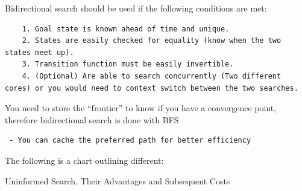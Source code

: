 \documentclass[
  letterpaper,
  DIV=11,
  numbers=noendperiod]{scrartcl}
\begin{document}
Bidirectional search should be used if the following conditions are met:

\begin{verbatim}
    1. Goal state is known ahead of time and unique.
    2. States are easily checked for equality (know when the two states meet up).
    3. Transition function must be easily invertible.
    4. (Optional) Are able to search concurrently (Two different cores) or you would need to context switch between the two searches.
\end{verbatim}

\begin{tcolorbox}[enhanced jigsaw, opacitybacktitle=0.6, title=\textcolor{quarto-callout-note-color}{\faInfo}\hspace{0.5em}{Note}, toptitle=1mm, left=2mm, breakable, titlerule=0mm, bottomtitle=1mm, bottomrule=.15mm, leftrule=.75mm, colframe=quarto-callout-note-color-frame, arc=.35mm, rightrule=.15mm, toprule=.15mm, coltitle=black, colback=white, opacityback=0, colbacktitle=quarto-callout-note-color!10!white]

You need to store the ``frontier'' to know if you have a convergence
point, therefore bidirectional search is done with BFS

\begin{verbatim}
 - You can cache the preferred path for better efficiency 
\end{verbatim}

\end{tcolorbox}

The following is a chart outlining different:

Uninformed Search, Their Advantages and Subsequent Costs
\end{document}
